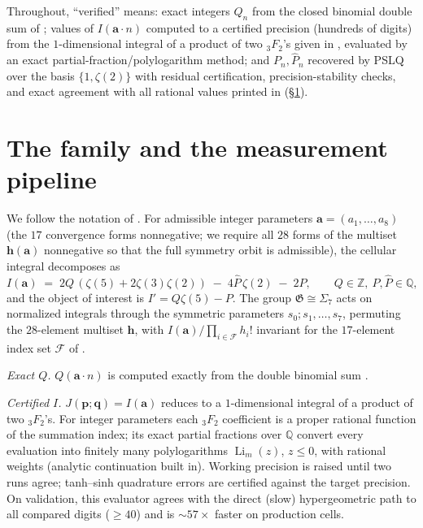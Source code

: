 \documentclass[11pt]{article}
\theoremstyle{definition}
\newcommand{\Z}{\mathbb{Z}}
\newcommand{\Q}{\mathbb{Q}}
\newcommand{\frG}{\mathfrak{G}}
\newcommand{\cF}{\mathcal{F}}
\begin{document}
Throughout, ``verified'' means: exact integers $Q_n$ from the closed
binomial double sum of \cite{BZ}; values of $I(\mathbf a\cdot n)$
computed to a certified precision (hundreds of digits) from the
$1$-dimensional integral of a product of two ${}_3F_2$'s given in
\cite{BZ}, evaluated by an exact partial-fraction/polylogarithm method;
and $P_n,\hat P_n$ recovered by PSLQ over the basis $\{1,\zeta(2)\}$
with residual certification, precision-stability checks, and exact
agreement with all rational values printed in \cite{BZ}
(\S\ref{sec:method}).

\section{The family and the measurement pipeline}\label{sec:method}

We follow the notation of \cite{BZ}. For admissible integer parameters
$\mathbf a=(a_1,\dots,a_8)$ (the $17$ convergence forms nonnegative; we
require all $28$ forms of the multiset $\mathbf h(\mathbf a)$
nonnegative so that the full symmetry orbit is admissible), the cellular
integral decomposes as
\[
I(\mathbf a) \;=\; 2Q\,(\zeta(5)+2\zeta(3)\zeta(2)) \;-\;
4\hat P\,\zeta(2)\;-\;2P ,\qquad Q\in\Z,\ P,\hat P\in\Q ,
\]
and the object of interest is $I'=Q\zeta(5)-P$. The group
$\frG\cong\Sigma_7$ acts on normalized integrals through the symmetric
parameters $s_0;s_1,\dots,s_7$, permuting the $28$-element multiset
$\mathbf h$, with $I(\mathbf a)/\prod_{i\in\cF}h_i!$ invariant for the
$17$-element index set $\cF$ of \cite{BZ}.

\emph{Exact $Q$.} $Q(\mathbf a\cdot n)$ is computed exactly from the
double binomial sum \cite[eq.~(sumQ)]{BZ}.

\emph{Certified $I$.} $J(\mathbf p;\mathbf q)=I(\mathbf a)$ reduces
\cite{BZ} to a $1$-dimensional integral of a product of two
${}_3F_2$'s. For integer parameters each ${}_3F_2$ coefficient is a
proper rational function of the summation index; its exact partial
fractions over $\Q$ convert every evaluation into finitely many
polylogarithms $\operatorname{Li}_m(z)$, $z\le0$, with rational weights
(analytic continuation built in). Working precision is raised until two
runs agree; tanh--sinh quadrature errors are certified against the
target precision. On validation, this evaluator agrees with the direct
(slow) hypergeometric path to all compared digits ($\ge40$) and is
$\sim57\times$ faster on production cells.
\end{document}

